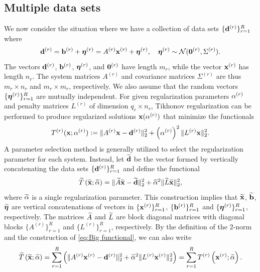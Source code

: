 \documentclass[12pt]{article}
\begin{document}
\subsection{Multiple data sets} \label{sec:Multiple data sets}
We now consider the situation where we have a collection of data sets $\{\mathbf{d}^{(r)}\}_{r=1}^R$ where 
\begin{equation}
\label{eq:Big vectors}
\mathbf{d}^{(r)} = \mathbf{b}^{(r)} + \bm{\eta}^{(r)} = {A^{(r)}}\mathbf{x}^{(r)} + \bm{\eta}^{(r)}, \quad \bm{\eta}^{(r)} \sim \mathcal{N}(\bm{0}^{(r)},\Sigma^{(r)}).
\end{equation}
The vectors $\mathbf{d}^{(r)}$, $\mathbf{b}^{(r)}$, $\bm{\eta}^{(r)}$, and $\bm{0}^{(r)}$ have length $m_r$, while the vector $\mathbf{x}^{(r)}$ has length $n_r$. The system matrices $A^{(r)}$ and covariance matrices $\Sigma^{(r)}$ are thus $m_r \times n_r$ and $m_r \times m_r$, respectively. We also assume that the random vectors $\{\bm{\eta}^{(r)}\}_{r=1}^R$ are mutually independent. For given regularization parameters $\alpha^{(r)}$ and penalty matrices $L^{(r)}$ of dimension $q_r \times n_r$, Tikhonov regularization can be performed to produce regularized solutions $\mathbf{x}(\alpha^{(r)})$ that minimize the functionals
\begin{equation}
T^{(r)}(\mathbf{x};\alpha^{(r)}) := \|A^{(r)}\mathbf{x} - \mathbf{d}^{(r)}\|_2^2 + \left(\alpha^{(r)}\right)^2\|L^{(r)}\mathbf{x}\|_2^2.
\end{equation}
A parameter selection method is generally utilized to select the regularization parameter for each system. Instead, let $\widetilde{\mathbf{d}}$ be the vector formed by vertically concatenating the data sets $\{\mathbf{d}^{(r)}\}_{r=1}^R$ and define the functional
\begin{equation}
\label{eq:Big functional}
\widetilde{T}\left(\widetilde{\mathbf{x}};\widetilde{\alpha}\right) = \|\widetilde{A}\widetilde{\mathbf{x}} - \widetilde{\mathbf{d}}\|_2^2 + \widetilde{\alpha}^2\|\widetilde{L}\widetilde{\mathbf{x}}\|_2^2,
\end{equation}
where $\widetilde{\alpha}$ is a single regularization parameter. This construction implies that $\widetilde{\mathbf{x}}$, $\widetilde{\mathbf{b}}$, $\widetilde{\bm{\eta}}$ are vertical concatenations of vectors in $\{\mathbf{x}^{(r)}\}_{r=1}^R$, $\{\mathbf{b}^{(r)}\}_{r=1}^R$ and $\{\bm{\eta}^{(r)}\}_{r=1}^R$, respectively. The matrices $\widetilde{A}$ and $\widetilde{L}$ are block diagonal matrices with diagonal blocks $\{A^{(r)}\}_{r=1}^R$ and $\{L^{(r)}\}_{r=1}^R$, respectively. By the definition of the 2-norm and the construction of \eqref{eq:Big functional}, we can also write
\begin{equation}
\label{eq:Big functional 2}
\widetilde{T}\left(\widetilde{\mathbf{x}};\widetilde{\alpha}\right) = \sum_{r=1}^R \left(\|A^{(r)}\mathbf{x}^{(r)} - \mathbf{d}^{(r)}\|_2^2 + \widetilde{\alpha}^2\|L^{(r)} \mathbf{x}^{(r)}\|_2^2\right) = \sum_{r=1}^R T^{(r)}\left(\mathbf{x}^{(r)};\widetilde{\alpha}\right).
\end{equation}
\end{document}

